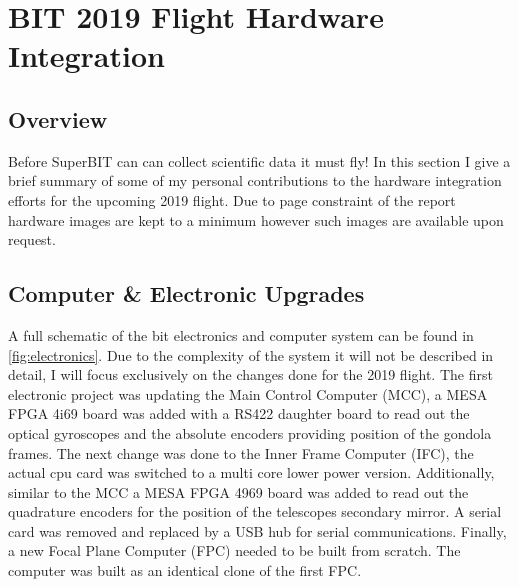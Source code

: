 \chapter{BIT 2019 Flight Hardware Integration}
\section{Overview}
Before SuperBIT can can collect scientific data it must fly! In this section I give a brief summary of some of my personal contributions to the hardware integration efforts for the upcoming 2019 flight. Due to page constraint of the report hardware images are kept to a minimum however such images are available upon request. 


\section{Computer \& Electronic Upgrades}
A full schematic of the bit electronics and computer system can be found in \autoref{fig:electronics}. Due to the complexity of the system it will not be described in detail, I will focus exclusively on the changes done for the 2019 flight. The first electronic project was updating the Main Control Computer (MCC), a MESA FPGA 4i69 board was added with a RS422 daughter board to read out the optical gyroscopes and the absolute encoders providing position of the gondola frames. The next change was done to the Inner Frame Computer (IFC), the actual cpu card was switched to a multi core lower power version. Additionally, similar to the MCC a MESA FPGA 4969 board was added to read out the quadrature encoders for the position of the telescopes secondary mirror. A serial card was removed and replaced by a USB hub for serial communications. Finally, a new Focal Plane Computer (FPC) needed to be built from scratch. The computer was built as an identical clone of the first FPC. 

